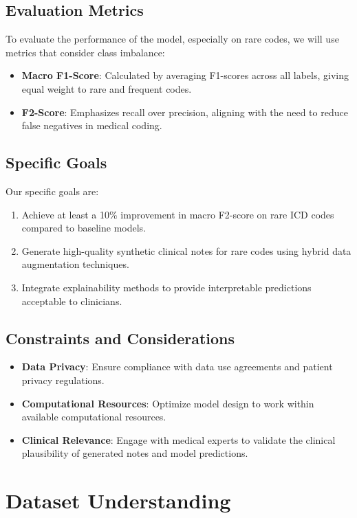 \documentclass[12pt,a4paper]{report}
\begin{document}
\section{Evaluation Metrics}
To evaluate the performance of the model, especially on rare codes, we will use metrics that consider class imbalance:
\begin{itemize}
    \item \textbf{Macro F1-Score}: Calculated by averaging F1-scores across all labels, giving equal weight to rare and frequent codes.
    \item \textbf{F2-Score}: Emphasizes recall over precision, aligning with the need to reduce false negatives in medical coding.
\end{itemize}

\section{Specific Goals}
Our specific goals are:
\begin{enumerate}
    \item Achieve at least a 10\% improvement in macro F2-score on rare ICD codes compared to baseline models.
    \item Generate high-quality synthetic clinical notes for rare codes using hybrid data augmentation techniques.
    \item Integrate explainability methods to provide interpretable predictions acceptable to clinicians.
\end{enumerate}

\section{Constraints and Considerations}
\begin{itemize}
    \item \textbf{Data Privacy}: Ensure compliance with data use agreements and patient privacy regulations.
    \item \textbf{Computational Resources}: Optimize model design to work within available computational resources.
    \item \textbf{Clinical Relevance}: Engage with medical experts to validate the clinical plausibility of generated notes and model predictions.
\end{itemize}

\chapter{Dataset Understanding}
\end{document}
